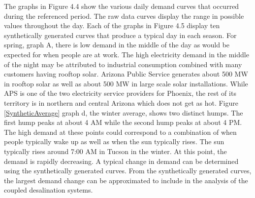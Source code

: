 \documentclass[12pt]{UIdahoMastersThesis}
\begin{document}
The graphs in Figure 4.4 show the various daily demand curves that occurred during the referenced period. The raw data curves display the range in possible values throughout the day. Each of the graphs in Figure 4.5 display ten synthetically generated curves that produce a typical day in each season. For spring, graph A, there is low demand in the middle of the day as would be expected for when people are at work. The high electricity demand in the middle of the night may be attributed to industrial consumption combined with many customers having rooftop solar.  Arizona Public Service generates about 500 MW in rooftop solar as well as about 500 MW in large scale solar installations. While APS is one of the two electricity service providers for Phoenix, the rest of its territory is in northern and central Arizona which does not get as hot. Figure \ref{SyntheticAverage} graph d, the winter average, shows two distinct humps.  The first hump peaks at about 4 AM while the second hump peaks at about 4 PM. The high demand at these points could correspond to a combination of when people typically wake up as well as when the sun typically rises. The sun typically rises around 7:00 AM in Tucson in the winter.  At this point, the demand is rapidly decreasing.  A typical change in demand can be determined using the synthetically generated curves. From the synthetically generated curves, the largest demand change can be approximated to include in the analysis of the coupled desalination systems. 

\end{document}
